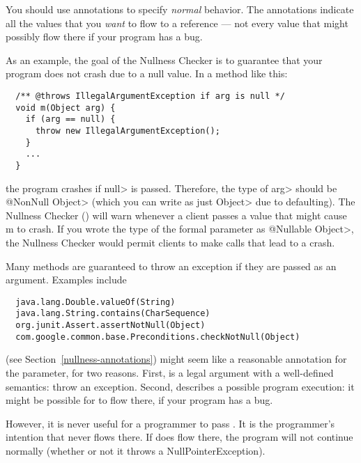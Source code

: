
You should use annotations to specify \emph{normal} behavior.  The
annotations indicate all the values that you \emph{want} to flow to a
reference --- not every value that might possibly flow there if your
program has a bug.

As an example, the goal of the Nullness Checker is to guarantee that your
program does not crash due to a null value.  In a method like this:

\begin{Verbatim}
  /** @throws IllegalArgumentException if arg is null */
  void m(Object arg) {
    if (arg == null) {
      throw new IllegalArgumentException();
    }
    ...
  }
\end{Verbatim}

\noindent
the program crashes if \<null> is passed.  Therefore, the type of \<arg>
should be \<@NonNull Object> (which you can write as just \<Object> due to
defaulting).  The Nullness Checker ()
will warn whenever a client passes a
value that might cause m to crash.  If you wrote the type of the formal
parameter as \<@Nullable Object>, the Nullness Checker would permit clients
to make calls that lead to a crash.


Many methods are guaranteed to throw an exception if they are passed 
as an argument.  Examples include

\begin{Verbatim}
  java.lang.Double.valueOf(String)
  java.lang.String.contains(CharSequence)
  org.junit.Assert.assertNotNull(Object)
  com.google.common.base.Preconditions.checkNotNull(Object)
\end{Verbatim}

 (see Section~\ref{nullness-annotations})
might seem like a reasonable annotation for the parameter,
for two reasons.  First,  is a legal argument with a
well-defined semantics:  throw an exception.  Second, 
describes a possible program execution:  it might be possible for
 to flow there, if your program has a bug.


However, it is never useful for a programmer to pass .  It is
the programmer's intention that  never flows there.  If
 does flow there, the program will not continue normally
(whether or not it throws a NullPointerException).

